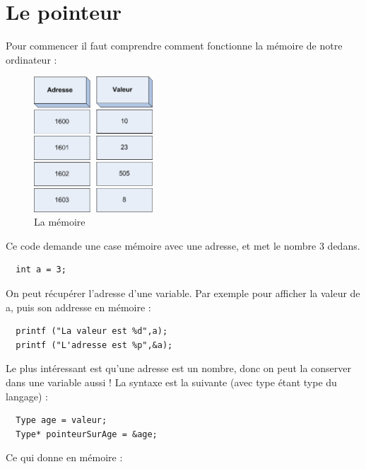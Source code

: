 \section{Le pointeur}
Pour commencer il faut comprendre comment fonctionne la mémoire de notre ordinateur : 
\begin{figure}[H]
  \begin{center}
	  \includegraphics[width=12em]{Annexes/Images/tableau.png}
	\end{center}
	\caption{La mémoire}
\end{figure}

Ce code demande une case mémoire avec une adresse, et met le nombre 3 dedans.

\begin{lstlisting}
  int a = 3;
\end{lstlisting}

On peut récupérer l'adresse d'une variable. Par exemple pour afficher la valeur de a, puis son addresse en mémoire : 

\begin{lstlisting}
  printf ("La valeur est %d",a);
  printf ("L'adresse est %p",&a);
\end{lstlisting}

Le plus intéressant est qu'une adresse est un nombre, donc on peut la conserver dans une variable aussi !
La syntaxe est la suivante (avec type étant type du langage) : 

\begin{lstlisting}
  Type age = valeur;
  Type* pointeurSurAge = &age;
\end{lstlisting}

Ce qui donne en mémoire : 

